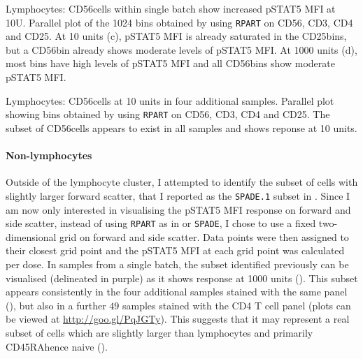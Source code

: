 {  Lymphocytes: CD56\high cells within single batch show increased pSTAT5 MFI at 10U. }
{
    Parallel plot of the 1024 bins obtained by using \texttt{RPART} on CD56, CD3, CD4 and CD25.
    At 10 units (c), pSTAT5 MFI is already saturated in the CD25\high bins, but a CD56\high bin already shows moderate levels of pSTAT5 MFI.
    At 1000 units (d), most bins have high levels of pSTAT5 MFI and all CD56\positive bins show moderate pSTAT5 MFI.
}

{ Lymphocytes: CD56\high cells at 10 units in four additional samples.  }
{
    Parallel plot showing bins obtained by using \texttt{RPART} on CD56, CD3, CD4 and CD25.
    The subset of CD56\high cells appears to exist in all samples and shows reponse at 10 units.
}

\paragraph{Non-lymphocytes}

Outside of the lymphocyte cluster, I attempted to identify the subset of cells with slightly larger forward scatter, that I reported as the \texttt{SPADE.1} subset in .
Since I am now only interested in visualising the pSTAT5 MFI response on forward and side scatter, instead of using \texttt{RPART} as in  or \texttt{SPADE}, I chose to use a fixed two-dimensional grid on forward and side scatter.
Data points were then assigned to their closest grid point and the pSTAT5 MFI at each grid point was calculated per dose.
In samples from a single batch, the subset identified previously can be visualised (delineated in purple) as it shows response at 1000 units ().
This subset appears consistently in the four additional samples stained with the same panel (), but also in a further $49$ samples stained with the CD4 T cell panel (plots can be viewed at \url{http://goo.gl/PqJGTy}).
This suggests that it may represent a real subset of cells which are slightly larger than lymphocytes and primarily CD45RA\positive hence naive ().

